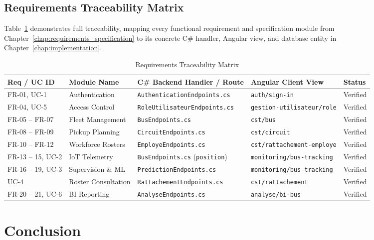 \subsection{Requirements Traceability Matrix}
Table~\ref{tab:traceability_matrix} demonstrates full traceability, mapping every functional requirement and specification module from Chapter~\ref{chap:requirements_specification} to its concrete C\# handler, Angular view, and database entity in Chapter~\ref{chap:implementation}.

\begin{table}[H]
  \centering
  \small
  \caption{Requirements Traceability Matrix}
  \label{tab:traceability_matrix}
  \begin{tabular}{|l|l|l|l|l|}
    \hline
    \textbf{Req / UC ID} & \textbf{Module Name} & \textbf{C\# Backend Handler / Route} & \textbf{Angular Client View} & \textbf{Status} \\ \hline
    FR-01, UC-1 & Authentication & \texttt{AuthenticationEndpoints.cs} & \texttt{auth/sign-in} & Verified \\ \hline
    FR-04, UC-5 & Access Control & \texttt{RoleUtilisateurEndpoints.cs} & \texttt{gestion-utilisateur/role} & Verified \\ \hline
    FR-05 -- FR-07 & Fleet Management & \texttt{BusEndpoints.cs} & \texttt{cst/bus} & Verified \\ \hline
    FR-08 -- FR-09 & Pickup Planning & \texttt{CircuitEndpoints.cs} & \texttt{cst/circuit} & Verified \\ \hline
    FR-10 -- FR-12 & Workforce Rosters & \texttt{EmployeEndpoints.cs} & \texttt{cst/rattachement-employe} & Verified \\ \hline
    FR-13 -- 15, UC-2 & IoT Telemetry & \texttt{BusEndpoints.cs} (\texttt{position}) & \texttt{monitoring/bus-tracking} & Verified \\ \hline
    FR-16 -- 19, UC-3 & Supervision \& ML & \texttt{PredictionEndpoints.cs} & \texttt{monitoring/bus-tracking} & Verified \\ \hline
    UC-4 & Roster Consultation & \texttt{RattachementEndpoints.cs} & \texttt{cst/rattachement} & Verified \\ \hline
    FR-20 -- 21, UC-6 & BI Reporting & \texttt{AnalyseEndpoints.cs} & \texttt{analyse/bi-bus} & Verified \\ \hline
  \end{tabular}
\end{table}

\section{Conclusion}
\label{sec:impl_conclusion}

